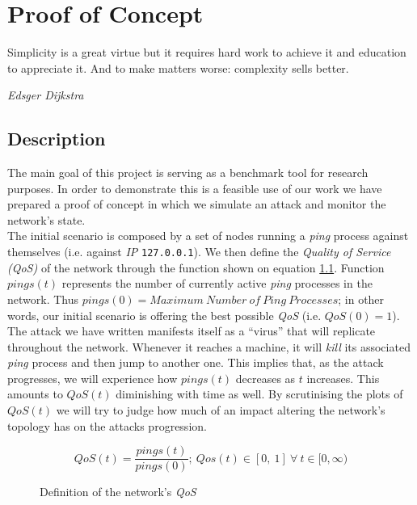 \chapter{Proof of Concept} \label{chap:5}
    \epigraph{Simplicity is a great virtue but it requires hard work to achieve it and education to appreciate it.
        And to make matters worse: complexity sells better.}{\textit{Edsger Dijkstra}}

    \section{Description}
        The main goal of this project is serving as a benchmark tool for research purposes. In order to demonstrate this is a feasible use of our work we have prepared a proof of concept in which we simulate an attack and monitor the network's state.\\

        The initial scenario is composed by a set of nodes running a \textit{ping} process against themselves (i.e. against \textit{IP} \texttt{127.0.0.1}). We then define the \textit{Quality of Service (QoS)} of the network through the function shown on equation \ref{eq:net-qos}. Function $pings(t)$ represents the number of currently active \textit{ping} processes in the network. Thus $pings(0) = Maximum\ Number\ of\ Ping\ Processes$; in other words, our initial scenario is offering the best possible \textit{QoS} (i.e. $QoS(0) = 1$).\\

        The attack we have written manifests itself as a ``virus'' that will replicate throughout the network. Whenever it reaches a machine, it will \textit{kill} its associated \textit{ping} process and then jump to another one. This implies that, as the attack progresses, we will experience how $pings(t)$ decreases as $t$ increases. This amounts to $QoS(t)$ diminishing with time as well. By scrutinising the plots of $QoS( t )$ we will try to judge how much of an impact altering the network's topology has on the attacks progression.\\

        {
            \renewcommand\figurename{Equation}
            \begin{figure}
                \[QoS(t) = \frac{pings(t)}{pings(0)};\ Qos(t) \in [0,\ 1]\ \forall\ t \in [0, \infty)\]
                \caption{Definition of the network's \textit{QoS}}
                \label{eq:net-qos}
            \end{figure}
        }

